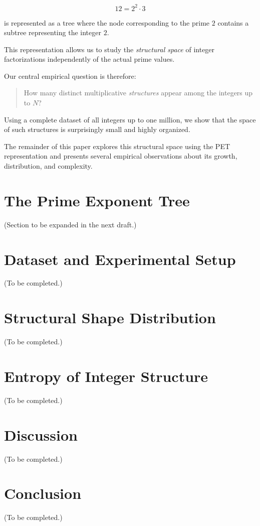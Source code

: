\documentclass[11pt]{article}
\begin{document}
\begin{equation}
12 = 2^2 \cdot 3
\end{equation}

is represented as a tree where the node corresponding to the prime $2$
contains a subtree representing the integer $2$.

This representation allows us to study the \emph{structural space} of
integer factorizations independently of the actual prime values.

Our central empirical question is therefore:

\begin{quote}
How many distinct multiplicative \emph{structures} appear among the integers
up to $N$?
\end{quote}

Using a complete dataset of all integers up to one million, we show that the
space of such structures is surprisingly small and highly organized.

The remainder of this paper explores this structural space using the PET
representation and presents several empirical observations about its growth,
distribution, and complexity.

\section{The Prime Exponent Tree}

(Section to be expanded in the next draft.)

\section{Dataset and Experimental Setup}

(To be completed.)

\section{Structural Shape Distribution}

(To be completed.)

\section{Entropy of Integer Structure}

(To be completed.)

\section{Discussion}

(To be completed.)

\section{Conclusion}

(To be completed.)
\end{document}
